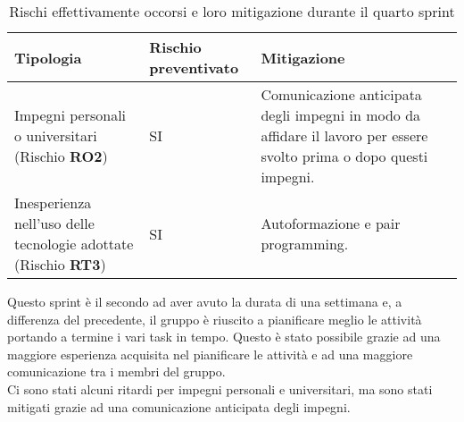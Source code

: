 \newpage %
\begin{table}[!h]
    \centering
    \begin{tabular}{ | p{6cm} | p{2.5cm} | p{7.5cm} | }
        \hline
        \textbf{Tipologia} & \textbf{Rischio preventivato} & \textbf{Mitigazione}  \\
        \hline
         Impegni personali o universitari (Rischio \textbf{RO2}) & SI & Comunicazione anticipata degli impegni in modo da affidare il lavoro per essere svolto prima o dopo questi impegni. \\
        \hline
         Inesperienza nell'uso delle tecnologie adottate (Rischio \textbf{RT3})& SI & Autoformazione e pair programming. \\
        \hline
    \end{tabular}
    \caption{Rischi effettivamente occorsi e loro mitigazione durante il quarto sprint}
    \label{tab:28}
\end{table}

Questo sprint è il secondo ad aver avuto la durata di una settimana e, a differenza del precedente, il gruppo è riuscito
a pianificare meglio le attività portando a termine i vari task in tempo.
Questo è stato possibile grazie ad una maggiore esperienza acquisita nel pianificare le attività e ad una maggiore
comunicazione tra i membri del gruppo.\\
Ci sono stati alcuni ritardi per impegni personali e universitari, ma sono stati mitigati grazie ad una comunicazione
anticipata degli impegni.



